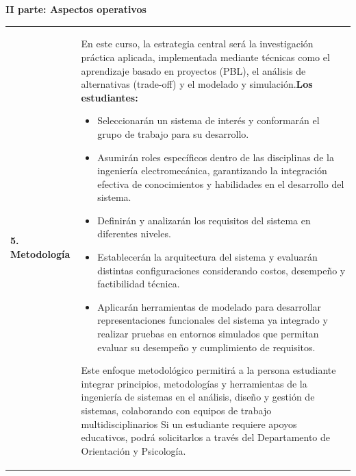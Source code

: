 \documentclass[letterpaper]{article}%
\begin{document}
\newpage%
\par\fontsize{14}{0}\selectfont \textbf{\textcolor{parte}{II parte: Aspectos operativos}}%
\vspace*{4mm}%
\newline%
\fontsize{10}{12}\selectfont %
\begin{tabularx}{\textwidth}{p{3cm}p{13cm}}%
\par\fontsize{12}{14}\selectfont \textbf{\textcolor{parte}{5. Metodología}}&En este curso, la estrategia central será la investigación práctica aplicada, implementada mediante técnicas como el aprendizaje basado en proyectos (PBL), el análisis de alternativas (trade-off) y el modelado y simulación.\newline\newline \textbf{Los estudiantes:}\begin{itemize}\item Seleccionarán un sistema de interés y conformarán el grupo de trabajo para su desarrollo.\item Asumirán roles específicos dentro de las disciplinas de la ingeniería electromecánica, garantizando la integración efectiva de conocimientos y habilidades en el desarrollo del sistema.\item Definirán y analizarán los requisitos del sistema en diferentes niveles.\item Establecerán la arquitectura del sistema y evaluarán distintas configuraciones considerando costos, desempeño y factibilidad técnica.\item Aplicarán herramientas de modelado para desarrollar representaciones funcionales del sistema ya integrado y realizar pruebas en entornos simulados que permitan evaluar su desempeño y cumplimiento de requisitos.\end{itemize}\vspace*{2mm}Este enfoque metodológico permitirá a la persona estudiante integrar principios, metodologías y herramientas de la ingeniería de sistemas en el análisis, diseño y gestión de sistemas, colaborando con equipos de trabajo multidisciplinarios\vspace*{2mm} \newline  Si un estudiante requiere apoyos educativos, podrá solicitarlos a través del Departamento de Orientación y Psicología.\\%
\end{tabularx}%
\vspace*{2mm}%
\newline%
\end{document}
